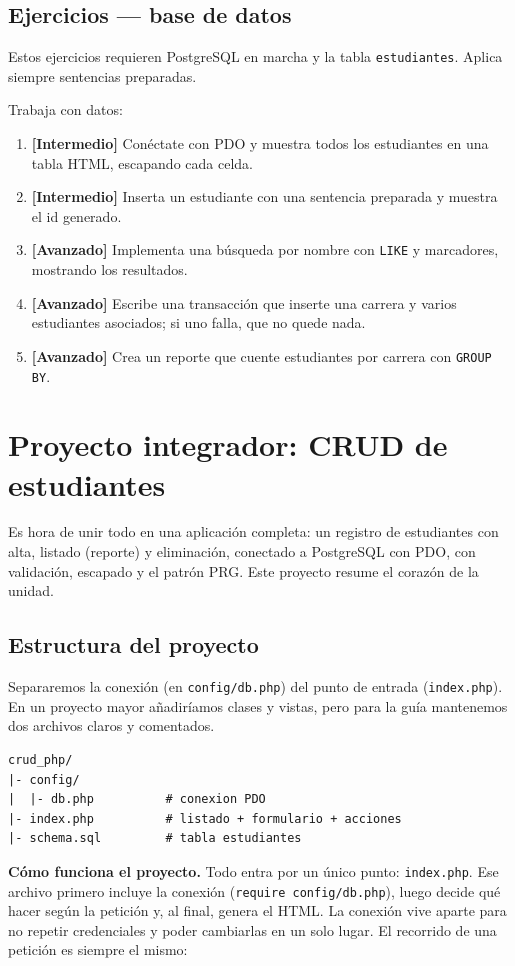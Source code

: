\documentclass[11pt]{article}
\begin{document}
\subsection{Ejercicios — base de datos}
Estos ejercicios requieren PostgreSQL en marcha y la tabla \texttt{estudiantes}. Aplica siempre sentencias preparadas.

Trabaja con datos:

\begin{enumerate}[leftmargin=1.7em,itemsep=3pt,topsep=2pt]
\item \textbf{[Intermedio]} Conéctate con PDO y muestra todos los estudiantes en una tabla HTML, escapando cada celda.
\item \textbf{[Intermedio]} Inserta un estudiante con una sentencia preparada y muestra el id generado.
\item \textbf{[Avanzado]} Implementa una búsqueda por nombre con \texttt{LIKE} y marcadores, mostrando los resultados.
\item \textbf{[Avanzado]} Escribe una transacción que inserte una carrera y varios estudiantes asociados; si uno falla, que no quede nada.
\item \textbf{[Avanzado]} Crea un reporte que cuente estudiantes por carrera con \texttt{GROUP BY}.
\end{enumerate}
\section{Proyecto integrador: CRUD de estudiantes}
Es hora de unir todo en una aplicación completa: un registro de estudiantes con alta, listado (reporte) y eliminación, conectado a PostgreSQL con PDO, con validación, escapado y el patrón PRG. Este proyecto resume el corazón de la unidad.

\subsection{Estructura del proyecto}
Separaremos la conexión (en \texttt{config/\allowbreak{}db.\allowbreak{}php}) del punto de entrada (\texttt{index.\allowbreak{}php}). En un proyecto mayor añadiríamos clases y vistas, pero para la guía mantenemos dos archivos claros y comentados.

\begin{cajacodigo}[Estructura]
\begin{lstlisting}[style=markup]
crud_php/
|- config/
|  |- db.php          # conexion PDO
|- index.php          # listado + formulario + acciones
|- schema.sql         # tabla estudiantes
\end{lstlisting}
\end{cajacodigo}
\vspace{2pt}
\textbf{Cómo funciona el proyecto.} Todo entra por un único punto: \texttt{index.\allowbreak{}php}. Ese archivo primero incluye la conexión (\texttt{require config/\allowbreak{}db.\allowbreak{}php}), luego decide qué hacer según la petición y, al final, genera el HTML. La conexión vive aparte para no repetir credenciales y poder cambiarlas en un solo lugar. El recorrido de una petición es siempre el mismo:
\end{document}
